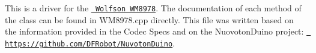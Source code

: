 This is a driver for the \href{https://www.mouser.com/ds/2/76/WM8978_v4.5-1141768.pdf}{\texttt{ Wolfson W\+M8978}}. The documentation of each method of the class can be found in {\ttfamily W\+M8978.\+cpp} directly. This file was written based on the information provided in the Codec Specs and on the Nuovoton\+Duino project\+: \href{https://github.com/DFRobot/NuvotonDuino}{\texttt{ https\+://github.\+com/\+D\+F\+Robot/\+Nuvoton\+Duino}}. 